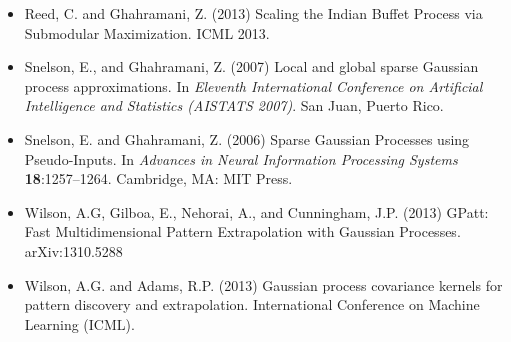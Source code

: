 {\begin{itemize}


\item Reed, C. and Ghahramani, Z. (2013) Scaling the Indian Buffet Process
via Submodular Maximization. ICML 2013.

\item Snelson, E., and Ghahramani, Z. (2007) Local and global sparse
  Gaussian process approximations. In {\em
    Eleventh International Conference on Artificial Intelligence and
    Statistics (AISTATS 2007)}. San Juan, Puerto Rico.

\item Snelson, E. and Ghahramani, Z. (2006) Sparse 
Gaussian Processes using Pseudo-Inputs.
In {\em Advances in Neural Information Processing Systems}
{\bf 18}:1257--1264. Cambridge, MA: MIT Press.





\item Wilson, A.G, Gilboa, E., Nehorai, A., and Cunningham,
  J.P. (2013) GPatt: Fast Multidimensional Pattern Extrapolation with
  Gaussian Processes. arXiv:1310.5288

\item Wilson, A.G. and Adams, R.P. (2013)  Gaussian process covariance
  kernels for pattern discovery and extrapolation. International
  Conference on Machine Learning (ICML). 




\end{itemize}
}

